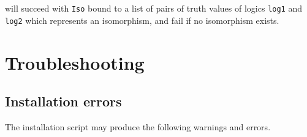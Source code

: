 \documentclass[]{article}
\newcommand{\passthrough}[1]{#1}
\begin{document}
will succeed with \passthrough{\lstinline!Iso!} bound to a list of pairs
of truth values of logics \passthrough{\lstinline!log1!} and
\passthrough{\lstinline!log2!} which represents an isomorphism, and fail
if no isomorphism exists.

\hypertarget{troubleshooting}{%
\section{Troubleshooting}\label{troubleshooting}}

\hypertarget{installation-errors}{%
\subsection{Installation errors}\label{installation-errors}}

The installation script may produce the following warnings and errors.
\end{document}
